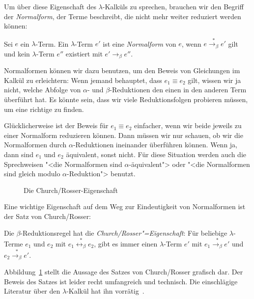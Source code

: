 Um über diese Eigenschaft des $\lambda$-Kalküls zu sprechen, brauchen
wir den Begriff der \textit{Normalform}, der Terme beschreibt, die
nicht mehr weiter reduziert werden können:
%
\begin{definition}[Normalform]
  Sei $e$ ein $\lambda$-Term.  Ein $\lambda$-Term $e'$ ist eine
  \textit{Normalform} von $e$, wenn
  $e\overset{\ast}{\rightarrow_\beta}e'$ gilt und kein $\lambda$-Term
  $e''$ existiert mit
  $e'\rightarrow_\beta e''$.
\end{definition}
%
Normalformen können wir dazu benutzen, um den Beweis von Gleichungen
im Kalkül zu erleichtern: Wenn jemand behauptet, dass $e_1 \equiv e_2$
gilt, wissen wir ja nicht, welche Abfolge von $\alpha$- und
$\beta$-Reduktionen den einen in den anderen Term überführt hat.  Es
könnte sein, dass wir viele Reduktionsfolgen probieren müssen, um eine
richtige zu finden.

Glücklicherweise ist der Beweis für $e_1 \equiv e_2$ einfacher, wenn
wir beide jeweils zu einer Normalform reduzieren können.  Dann müssen
wir nur schauen, ob wir die Normalformen durch $\alpha$-Reduktionen
ineinander überführen können.  Wenn ja, dann sind $e_1$ und $e_2$
äquivalent, sonst nicht.  Für diese Situation werden auch die
Sprechweisen "<die Normalformen sind $\alpha$-äquivalent"> oder "<die
Normalformen sind gleich modulo $\alpha$-Reduktion"> benutzt.

\begin{figure}[tb]
  \begin{center}
    \caption{Die Church/Rosser-Eigenschaft}
    \label{fig:church-rosser}
  \end{center}
\end{figure}

Eine wichtige Eigenschaft auf dem Weg zur Eindeutigkeit von
Normalformen ist der Satz von Church/Rosser:
%
\begin{satz}
  \label{satz:church-rosser}
  Die $\beta$-Reduktionsregel hat die 
  \textit{Church/Rosser"=Eigenschaft}:  Für
  beliebige $\lambda$-Terme $e_1$ und  $e_2$ mit
  $e_1 \overset{\ast}{\leftrightarrow_\beta} e_2$,
  gibt es immer einen $\lambda$-Term $e'$ mit
  $e_1\overset{\ast}{\rightarrow_\beta} e'$ und
  $e_2\overset{\ast}{\rightarrow_\beta} e'$.
\end{satz}
%
Abbildung~\ref{fig:church-rosser} stellt die Aussage des Satzes von
Church/Rosser grafisch dar.
Der Beweis des Satzes ist leider recht umfangreich und technisch.
Die einschlägige Literatur über den $\lambda$-Kalkül hat ihn
vorrätig~\cite{HindleySeldin1986}.

